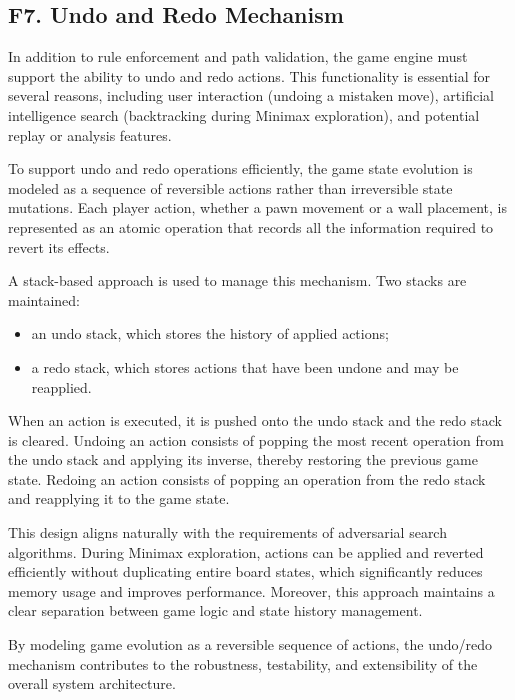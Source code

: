 \documentclass[a4paper]{article}
\begin{document}
\subsection*{F7. Undo and Redo Mechanism}

In addition to rule enforcement and path validation, the game engine must
support the ability to undo and redo actions. This functionality is essential
for several reasons, including user interaction (undoing a mistaken move),
artificial intelligence search (backtracking during Minimax exploration), and
potential replay or analysis features.

To support undo and redo operations efficiently, the game state evolution is
modeled as a sequence of reversible actions rather than irreversible state
mutations. Each player action, whether a pawn movement or a wall placement, is
represented as an atomic operation that records all the information required
to revert its effects.

A stack-based approach is used to manage this mechanism. Two stacks are
maintained:
\begin{itemize}
    \item an undo stack, which stores the history of applied actions;
    \item a redo stack, which stores actions that have been undone and may be
      reapplied.
\end{itemize}

When an action is executed, it is pushed onto the undo stack and the redo stack
is cleared. Undoing an action consists of popping the most recent operation
from the undo stack and applying its inverse, thereby restoring the previous
game state. Redoing an action consists of popping an operation from the redo
stack and reapplying it to the game state.

This design aligns naturally with the requirements of adversarial search
algorithms. During Minimax exploration, actions can be applied and reverted
efficiently without duplicating entire board states, which significantly
reduces memory usage and improves performance. Moreover, this approach
maintains a clear separation between game logic and state history management.

By modeling game evolution as a reversible sequence of actions, the undo/redo
mechanism contributes to the robustness, testability, and extensibility of the
overall system architecture.


\nocite{*}



\appendix
\end{document}
